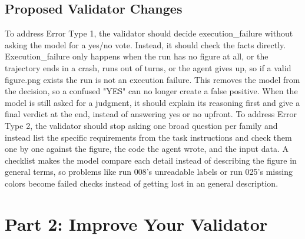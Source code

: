 \documentclass[11pt]{article}
\begin{document}
\subsection{Proposed Validator Changes}
To address Error Type 1, the validator should decide execution_failure without asking the model for a yes/no vote. Instead, it should check the facts directly. Execution_failure only happens when the run has no figure at all, or the trajectory ends in a crash, runs out of turns, or the agent gives up, so if a valid figure.png exists the run is not an execution failure. This removes the model from the decision, so a confused "YES" can no longer create a false positive. When the model is still asked for a judgment, it should explain its reasoning first and give a final verdict at the end, instead of answering yes or no upfront. To address Error Type 2, the validator should stop asking one broad question per family and instead list the specific requirements from the task instructions and check them one by one against the figure, the code the agent wrote, and the input data. A checklist makes the model compare each detail instead of describing the figure in general terms, so problems like run 008's unreadable labels or run 025's missing colors become failed checks instead of getting lost in an general description.

\section{Part 2: Improve Your Validator}
\end{document}
